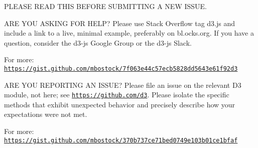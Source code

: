 P\+L\+E\+A\+SE R\+E\+AD T\+H\+IS B\+E\+F\+O\+RE S\+U\+B\+M\+I\+T\+T\+I\+NG A N\+EW I\+S\+S\+UE.

A\+RE Y\+OU A\+S\+K\+I\+NG F\+OR H\+E\+LP? Please use Stack Overflow tag d3.\+js and include a link to a live, minimal example, preferably on bl.\+ocks.\+org. If you have a question, consider the d3-\/js Google Group or the d3-\/js Slack.

For more\+: \href{https://gist.github.com/mbostock/7f063e44c57ecb5828dd5643e61f92d3}{\tt https\+://gist.\+github.\+com/mbostock/7f063e44c57ecb5828dd5643e61f92d3}

A\+RE Y\+OU R\+E\+P\+O\+R\+T\+I\+NG AN I\+S\+S\+UE? Please file an issue on the relevant D3 module, not here; see \href{https://github.com/d3}{\tt https\+://github.\+com/d3}. Please isolate the specific methods that exhibit unexpected behavior and precisely describe how your expectations were not met.

For more\+: \href{https://gist.github.com/mbostock/370b737ce71bed0749e103b01ce1bfaf}{\tt https\+://gist.\+github.\+com/mbostock/370b737ce71bed0749e103b01ce1bfaf} 
